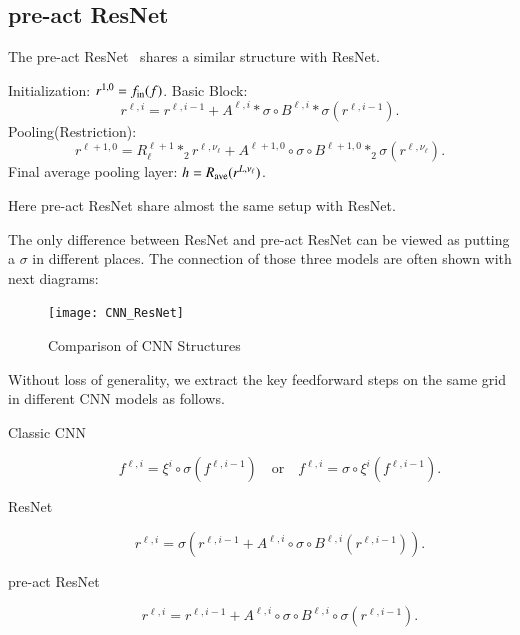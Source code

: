 \subsection{pre-act ResNet} 
The pre-act ResNet~\cite{he2016identity} shares a similar
structure with ResNet. 
\begin{breakablealgorithm}
	\footnotesize
	\caption{$ h = \text{pre-act ResNet}(f; J,\nu_1, \cdots, \nu_J)$}
	\label{alg:presnet}
	\begin{algorithmic}[1]
		\State Initialization:  $r^{1,0} = f_{\rm in}(f)$.
		\State Basic Block:
		\begin{equation}\label{ori-ResNet}
			r^{\ell,i} = r^{\ell, i-1} + A^{\ell,i} \ast  \sigma \circ B^{\ell,i}\ast   \sigma (r^{\ell,i-1}).
		\end{equation}
		\EndFor
		\State Pooling(Restriction):
		\begin{equation}
			\label{ori-ResNet0}
			r^{\ell+1,0} = R_\ell^{\ell+1} \ast_2  r^{\ell, \nu_\ell} + A^{\ell+1,0} \circ \sigma \circ B^{\ell+1,0} \ast_2  \sigma (r^{\ell, \nu_\ell} ).
		\end{equation}
		\EndFor
		\State Final average pooling layer:
		$h =  R_{\rm ave}( r^{L,\nu_\ell})$.
	\end{algorithmic}
\end{breakablealgorithm}
Here pre-act ResNet share almost the same setup with ResNet.


The only difference between ResNet and pre-act ResNet can be viewed as 
putting a $\sigma$ in different places. 
The connection of those three models are often shown with next diagrams:
\begin{figure}[!htb]
	\begin{center}
		\texttt{[image: CNN\_ResNet]} 
	\end{center}
	\caption{Comparison of CNN Structures}
\end{figure}

Without loss of generality, we extract the key 
feedforward steps on the same grid in different CNN models as follows.
\begin{description}
	\item[Classic CNN] 
	\begin{equation}\label{eq:cCNN}
	f^{\ell,i} = \xi^i \circ \sigma (f^{\ell,i-1}) \quad \text{or} \quad f^{\ell,i} = \sigma \circ \xi^{i} (f^{\ell,i-1}) .
	\end{equation}
	\item[ResNet] 
	\begin{equation}\label{eq:ResNet}
	r^{\ell,i} = \sigma( r^{\ell,i-1} + A^{\ell,i} \circ \sigma \circ B^{\ell,i}(r^{\ell,i-1})).
	\end{equation}
	\item[pre-act ResNet]
	\begin{equation}\label{eq:pre-act ResNet}
	r^{\ell,i} = r^{\ell,i-1} + A^{\ell,i} \circ \sigma \circ B^{\ell,i}\circ \sigma(r^{\ell,i-1}).
	\end{equation}
\end{description} 